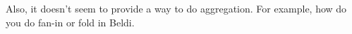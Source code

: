 Also, it doesn't seem to provide a way to do aggregation. For example, how do
you do fan-in or fold in Beldi.




 



